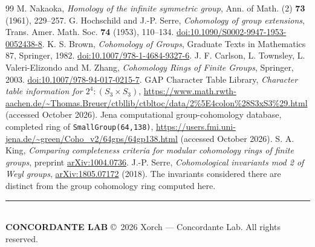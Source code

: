 \documentclass[11pt,a4paper]{article}
\theoremstyle{remark}\newtheorem{remark}[theorem]{Remark}
\begin{document}
\begin{thebibliography}{99}
M. Nakaoka, \emph{Homology of the infinite symmetric group}, Ann. of Math. (2) \textbf{73} (1961), 229--257.
G. Hochschild and J.-P. Serre, \emph{Cohomology of group extensions}, Trans. Amer. Math. Soc. \textbf{74} (1953), 110--134. \href{https://doi.org/10.1090/S0002-9947-1953-0052438-8}{doi:10.1090/S0002-9947-1953-0052438-8}.
K. S. Brown, \emph{Cohomology of Groups}, Graduate Texts in Mathematics 87, Springer, 1982. \href{https://doi.org/10.1007/978-1-4684-9327-6}{doi:10.1007/978-1-4684-9327-6}.
J. F. Carlson, L. Townsley, L. Valeri-Elizondo and M. Zhang, \emph{Cohomology Rings of Finite Groups}, Springer, 2003. \href{https://doi.org/10.1007/978-94-017-0215-7}{doi:10.1007/978-94-017-0215-7}.
GAP Character Table Library, \emph{Character table information for \(2^4:(S_3\times S_3)\)}, \url{https://www.math.rwth-aachen.de/~Thomas.Breuer/ctbllib/ctbltoc/data/2%5E4colon%28S3xS3%29.html} (accessed October 2026).
Jena computational group-cohomology database, completed ring of \texttt{SmallGroup(64,138)}, \url{https://users.fmi.uni-jena.de/~green/Coho_v2/64gps/64gp138.html} (accessed October 2026).
S. A. King, \emph{Comparing completeness criteria for modular cohomology rings of finite groups}, preprint \href{https://arxiv.org/abs/1004.0736}{arXiv:1004.0736}.
J.-P. Serre, \emph{Cohomological invariants mod 2 of Weyl groups}, \href{https://arxiv.org/abs/1805.07172}{arXiv:1805.07172} (2018). The invariants considered there are distinct from the group cohomology ring computed here.
\end{thebibliography}
\vspace{4mm}
\noindent\color{soft}\rule{\linewidth}{0.5pt}\\
{\small\sffamily\textbf{CONCORDANTE LAB} \quad \copyright\ 2026 Xorch --- Concordante Lab. All rights reserved.}
\end{document}
